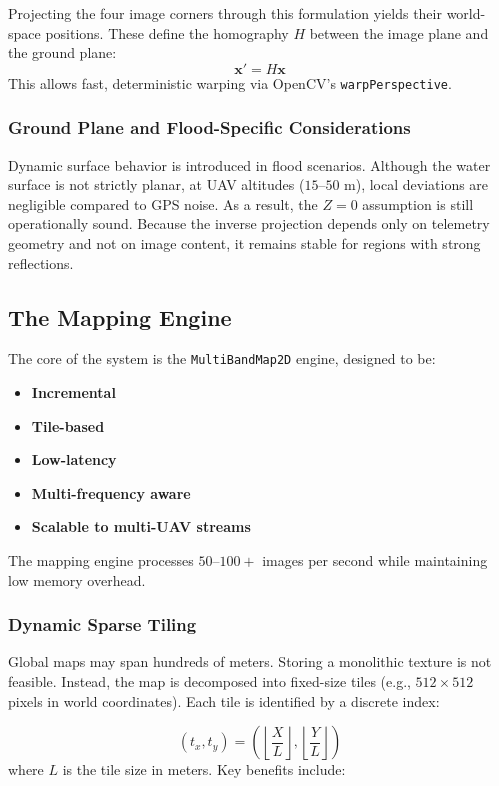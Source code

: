 \documentclass[conference]{IEEEtran}
\begin{document}
Projecting the four image corners through this formulation yields their world-space positions. These define the homography $H$ between the image plane and the ground plane:
\begin{equation}
\mathbf{x}' = H \mathbf{x}
\end{equation}
This allows fast, deterministic warping via OpenCV's \texttt{warpPerspective}.

\subsubsection{Ground Plane and Flood-Specific Considerations}
Dynamic surface behavior is introduced in flood scenarios. Although the water surface is not strictly planar, at UAV altitudes ($15$--$50$ m), local deviations are negligible compared to GPS noise. As a result, the $Z=0$ assumption is still operationally sound. Because the inverse projection depends only on telemetry geometry and not on image content, it remains stable for regions with strong reflections.

\subsection{The Mapping Engine}
The core of the system is the \texttt{MultiBandMap2D} engine, designed to be:
\begin{itemize}
    \item \textbf{Incremental}
    \item \textbf{Tile-based}
    \item \textbf{Low-latency}
    \item \textbf{Multi-frequency aware}
    \item \textbf{Scalable to multi-UAV streams}
\end{itemize}
The mapping engine processes $50$--$100+$ images per second while maintaining low memory overhead.

\subsubsection{Dynamic Sparse Tiling}
Global maps may span hundreds of meters. Storing a monolithic texture is not feasible. Instead, the map is decomposed into fixed-size tiles (e.g., $512 \times 512$ pixels in world coordinates). Each tile is identified by a discrete index:

\begin{equation}
(t_x, t_y) = \left( \left\lfloor \frac{X}{L} \right\rfloor, \left\lfloor \frac{Y}{L} \right\rfloor \right)
\end{equation}
where $L$ is the tile size in meters. Key benefits include:
\end{document}
